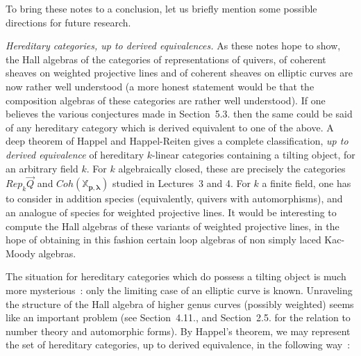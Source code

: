 \documentclass[a4paper,10pt]{amsart}
\def\xpl{\mathbb{X}_{\mathbf{p},\boldsymbol{\lambda}}}
\numberwithin{equation}{section}
\begin{document}
{To bring these notes to a conclusion, let us briefly mention some possible directions for future research.

\vspace{.15in}

\noindent
\textit{Hereditary categories, up to derived equivalences.} As these notes hope to show, the Hall algebras of the categories of representations of quivers, of coherent sheaves on weighted projective lines and of coherent sheaves on elliptic curves are now rather well understood (a more honest statement would be that the composition algebras of these categories are rather well understood).
If one believes the various conjectures made in Section~5.3. then the same could be said of any hereditary category which is derived equivalent to one of the above. A deep theorem of Happel \cite{Happel} and Happel-Reiten \cite{ReitenHappel} gives a complete classification, \textit{up to derived equivalence} of hereditary $k$-linear categories containing a tilting object, for an arbitrary field $k$. For $k$ algebraically closed, these are precisely the categories $Rep_k\vec{Q}$ and $Coh(\xpl)$ studied in Lectures~3 and 4. For $k$ a finite field, one has to consider in addition species (equivalently, quivers with automorphisms), and an analogue of species for weighted projective lines. It would be interesting to compute the Hall algebras of these variants of weighted projective lines, in the hope of obtaining in this fashion certain loop algebras of non simply laced Kac-Moody algebras.

 The situation for hereditary categories which do  possess a tilting object is much more mysterious~: only the limiting case of an elliptic curve is known. Unraveling the structure of the Hall algebra of higher genus curves (possibly weighted) seems like an important problem (see Section~4.11., and Section~2.5. for the relation to number theory and automorphic forms). By Happel's theorem, we may represent the set of hereditary categories, up to derived equivalence, in the following way~:

\vspace{.2in}

}
\end{document}
